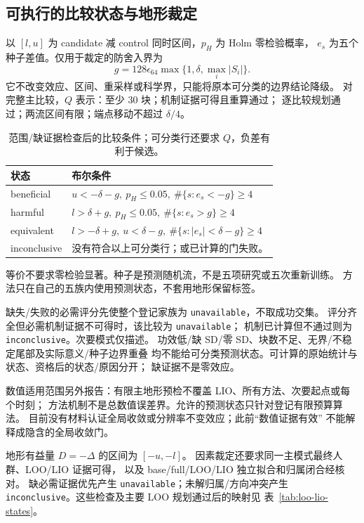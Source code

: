 \documentclass[UTF8,11pt]{ctexart}
\begin{document}
\subsection{可执行的比较状态与地形裁定}
\label{sec:decision-conditions}
以 \([l,u]\) 为 candidate 减 control 同时区间，\(p_H\) 为 Holm 零检验概率，
\(e_s\) 为五个种子差值。仅用于裁定的防舍入界为
\begin{equation}
 g=128\epsilon_{64}\max\{1,\delta,\max_i|S_i|\}.
 \label{eq:decision-roundoff}
\end{equation}
它不改变效应、区间、重采样或科学界，只能将原本可分类的边界结论降级。
对完整主比较，\(Q\) 表示：至少 30 块；机制证据可得且重算通过；
逐比较规划通过；两流区间有限；端点移动不超过 \(\delta/4\)。

\begin{table}[htbp]
\centering\small
\caption{范围/缺证据检查后的比较条件；可分类行还要求 \(Q\)，负差有利于候选。}
\label{tab:comparison-conditions}
\begin{tabular}{lp{4.8in}}
\toprule
状态 & 布尔条件\\
\midrule
beneficial & \(u<-\delta-g,\ p_H\leq0.05,\ \#\{s:e_s<-g\}\geq4\)\\
harmful & \(l>\delta+g,\ p_H\leq0.05,\ \#\{s:e_s>g\}\geq4\)\\
equivalent & \(l>-\delta+g,\ u<\delta-g,\ \#\{s:|e_s|<\delta-g\}\geq4\)\\
inconclusive & 没有符合以上可分类行；或已计算的门失败。\\
\bottomrule
\end{tabular}
\end{table}

等价不要求零检验显著。种子是预测随机流，不是五项研究或五次重新训练。
方法只在自己的五族内使用预测状态，不套用地形保留标签。

缺失/失败的必需评分先使整个登记家族为 \texttt{unavailable}，不取成功交集。
评分齐全但必需机制证据不可得时，该比较为 \texttt{unavailable}；
机制已计算但不通过则为 \texttt{inconclusive}。次要模式仅描述。
功效低/缺 SD/零 SD、块数不足、无界/不稳定尾部及实际意义/种子边界重叠
均不能给可分类预测状态。可计算的原始统计与状态、资格后的状态/原因分开；
缺证据不是零效应。

数值适用范围另外报告：有限主地形预检不覆盖 LIO、所有方法、次要起点或每个时刻；
方法机制不是总数值误差界。允许的预测状态只针对登记有限预算算法。
目前没有材料认证全局收敛或分辨率不变效应；此前“数值证据有效”
不能解释成隐含的全局收敛门。

地形有益量 \(D=-\Delta\) 的区间为 \([-u,-l]\)。
因素裁定还要求同一主模式最终人群、LOO/LIO 证据可得，
以及 base/full/LOO/LIO 独立拟合和归属闭合经核对。
缺必需证据优先产生 \texttt{unavailable}；未解归属/方向冲突产生
\texttt{inconclusive}。这些检查及主要 LOO 规划通过后的映射见
表~\ref{tab:loo-lio-states}。
\end{document}
